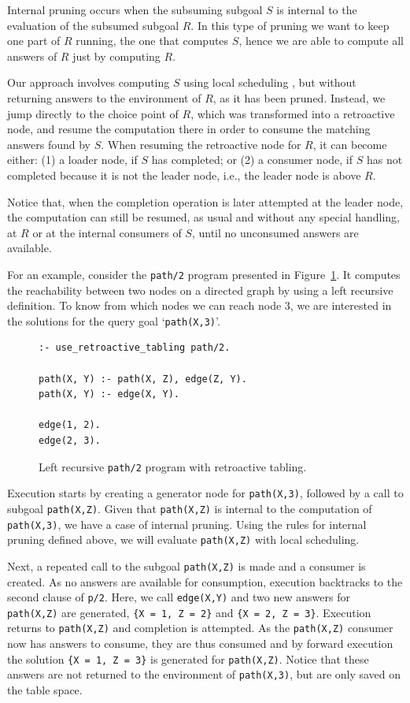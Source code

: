 Internal pruning occurs when the subsuming subgoal $S$ is internal to the evaluation of the
subsumed subgoal $R$. In this type of pruning we want to keep one part of $R$ running, the one
that computes $S$, hence we are able to compute all answers of $R$ just by computing $R$.

Our approach involves computing $S$ using local scheduling \cite{Freire-96}, but without returning
answers to the environment of $R$, as it has been pruned. Instead, we jump directly to the
choice point of $R$, which was transformed into a retroactive node, and resume the computation there
in order to consume the matching answers found by $S$. When resuming the retroactive node for $R$, it
can become either: (1) a loader node, if $S$ has completed; or (2) a consumer node, if $S$ has not
completed because it is not the leader node, i.e., the leader node is above $R$.

Notice that, when the completion operation is later attempted at the leader node, the computation can
still be resumed, as usual and without any special handling, at $R$ or at the internal consumers of $S$,
until no unconsumed answers are available.

For an example, consider the \texttt{path/2} program presented in Figure~\ref{fig:retro_path_program}.
It computes the reachability between two nodes on a directed graph by using a left recursive
definition. To know from which nodes we can reach node 3, we are interested in the solutions
for the query goal `\texttt{path(X,3)}'.

\begin{figure}[ht]
\begin{Verbatim}
:- use_retroactive_tabling path/2.

path(X, Y) :- path(X, Z), edge(Z, Y).
path(X, Y) :- edge(X, Y).

edge(1, 2).
edge(2, 3).
\end{Verbatim}
\caption{Left recursive \texttt{path/2} program with retroactive tabling.}
\label{fig:retro_path_program}
\end{figure}

Execution starts by creating a generator node for \texttt{path(X,3)}, followed by a call to
subgoal \texttt{path(X,Z)}. Given that \texttt{path(X,Z)} is internal to the computation of
\texttt{path(X,3)}, we have a case of internal pruning. Using the rules for internal pruning
defined above, we will evaluate \texttt{path(X,Z)} with local scheduling.

Next, a repeated call to the subgoal \texttt{path(X,Z)} is made and a consumer is created.
As no answers are available for consumption, execution backtracks to the second clause of \texttt{p/2}.
Here, we call \texttt{edge(X,Y)} and two new answers for \texttt{path(X,Z)} are generated,
\texttt{\{X~=~1,~Z~=~2\}} and \texttt{\{X~=~2,~Z~=~3\}}. Execution returns to \texttt{path(X,Z)} and
completion is attempted. As the \texttt{path(X,Z)} consumer now has answers to consume, they are
thus consumed and by forward execution the solution \texttt{\{X~=~1,~Z~=~3\}}  is generated for
\texttt{path(X,Z)}. Notice that these answers are not returned to the environment of
\texttt{path(X,3)}, but are only saved on the table space.

